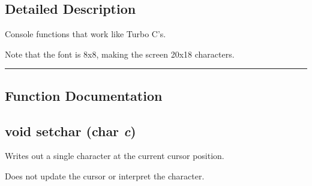 \subsection*{Detailed Description}
Console functions that work like Turbo C's.

Note that the font is 8x8, making the screen 20x18 characters. \vspace{0.4cm}\hrule\vspace{0.2cm}
\subsection*{Function Documentation}
\label{console.h_a3}
\subsection{\setlength{\rightskip}{0pt plus 5cm}void setchar (char {\em c})}

Writes out a single character at the current cursor position.

Does not update the cursor or interpret the character. 